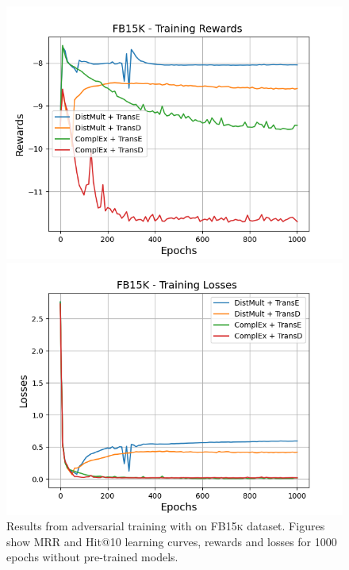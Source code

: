 \begin{figure}[H]
    \begin{minipage}{.5\textwidth}
      \centering
      \includegraphics[width=\linewidth]{figures/results/gan_train/not_pretrained/uncertainty/max/entropy/fb15k/1k_epochs/uncertainty_fb15k_rew.png}
    \end{minipage}%
     \begin{minipage}{.5\textwidth}
      \centering
      \includegraphics[width=\linewidth]{figures/results/gan_train/not_pretrained/uncertainty/max/entropy/fb15k/1k_epochs/uncertainty_fb15k_losses.png}
    \end{minipage}%
    \caption{Results from adversarial training with \usmax on \textsc{FB15k} dataset.
    Figures show MRR and Hit@10 learning curves, rewards and losses for 1000 epochs without pre-trained models.}
    \label{fig:gan_train_not_pretrained_usmax_fb15k}
\end{figure}
